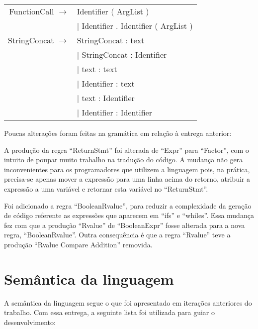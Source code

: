 \documentclass[12pt]{article}
\begin{document}
\begin{longtable}{ r l }
	FunctionCall	$\rightarrow$ 	& Identifier ( ArgList ) \\
									& $|$ Identifier . Identifier ( ArgList ) \\
	StringConcat	$\rightarrow$	& StringConcat : text \\
									& $|$ StringConcat : Identifier \\
									& $|$ text : text \\
									& $|$ Identifier : text \\
									& $|$ text : Identifier \\
									& $|$ Identifier : Identifier\\
\end{longtable}

Poucas alterações foram feitas na gramática em relação à entrega anterior:

A produção da regra ``ReturnStmt'' foi alterada de ``Expr'' para ``Factor'', com o intuito de poupar muito trabalho na tradução do código. A mudança não gera inconvenientes para os programadores que utilizem a linguagem pois, na prática, precisa-se apenas mover a expressão para uma linha acima do retorno, atribuir a expressão a uma variável e retornar esta variável no ``ReturnStmt''.

Foi adicionado a regra ``BooleanRvalue'', para reduzir a complexidade da geração de código referente as expressões que aparecem em ``ifs'' e ``whiles''. Essa mudança fez com que a produção ``Rvalue'' de ``BooleanExpr'' fosse alterada para a nova regra, ``BooleanRvalue''. Outra consequência é que a regra ``Rvalue'' teve a produção ``Rvalue Compare Addition'' removida.

\section{Semântica da linguagem}

\indent

A semântica da linguagem segue o que foi apresentado em iterações anteriores do trabalho. Com essa entrega, a seguinte lista foi utilizada para guiar o desenvolvimento:
\end{document}
